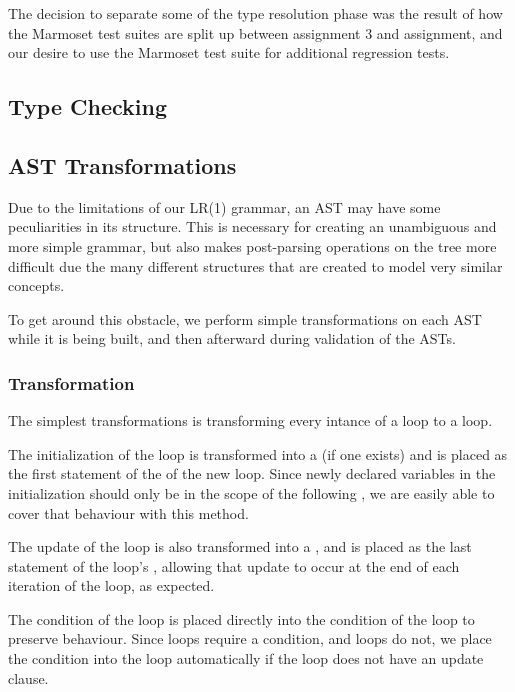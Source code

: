 \documentclass[pdftex,11pt,a4paper]{article}
\begin{document}
The decision to separate some of the type resolution phase was the
result of how the Marmoset test suites are split up between assignment
3 and assignment, and our desire to use the Marmoset test suite for
additional regression tests.

\subsection{Type Checking}



\subsection{AST Transformations}

Due to the limitations of our LR(1) grammar, an AST may have some
peculiarities in its structure. This is necessary for creating an
unambiguous and more simple grammar, but also makes post-parsing
operations on the tree more difficult due the many different
structures that are created to model very similar concepts.

To get around this obstacle, we perform simple transformations on each
AST while it is being built, and then afterward during validation of
the ASTs.

\subsubsection{ Transformation}

The simplest transformations is transforming every intance of a
 loop to a  loop.

The initialization of the  loop is transformed into a 
(if one exists) and is placed as the first statement of the  of
the new  loop. Since newly declared variables in the initialization
should only be in the scope of the following , we are easily able
to cover that behaviour with this method.

The update of the  loop is also transformed into a ,
and is placed as the last statement of the  loop's ,
allowing that update to occur at the end of each iteration of the loop, as
expected.

The condition of the  loop is placed directly into the condition of
the  loop to preserve behaviour. Since  loops require a
condition, and  loops do not, we place the  condition into
the  loop automatically if the  loop does not have an
update clause.
\end{document}
